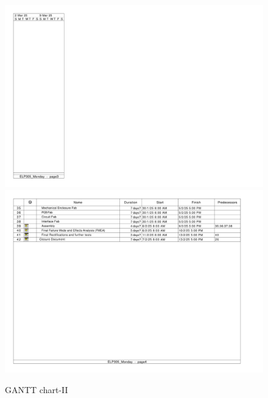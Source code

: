 \documentclass[12pt,a4paper]{article}
\begin{document}
\begin{figure}[H]
    \centering
    \includegraphics[width=1.2\textwidth]{gantt_new-3.png} %
    \includegraphics[width=1.2\textwidth]{gantt_new-4.png} %
    
    \caption{GANTT chart-II}
    
    \label{fig:GANTT CHART}
\end{figure}
\end{document}
